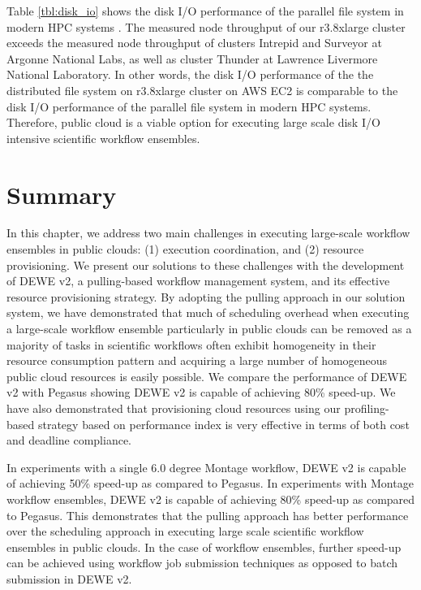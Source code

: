 Table \ref{tbl:disk_io} shows the disk I/O performance of the parallel file system in modern HPC systems \cite{borrill2009hpc}. The measured node throughput of our r3.8xlarge cluster exceeds the measured node throughput of clusters Intrepid and Surveyor at Argonne National Labs, as well as cluster Thunder at Lawrence Livermore National Laboratory. In other words, the disk I/O performance of the the distributed file system on r3.8xlarge cluster on AWS EC2 is comparable to the disk I/O performance of the parallel file system in modern HPC systems. Therefore, public cloud is a viable option for executing large scale disk I/O intensive scientific workflow ensembles.


\section{Summary}
\label{v2_sec:summary}

In this chapter, we address two main challenges in executing large-scale workflow ensembles in public clouds: (1) execution coordination, and (2) resource provisioning. We present our solutions to these challenges with the development of DEWE v2, a pulling-based workflow management system, and its effective resource provisioning strategy. 
By adopting the pulling approach in our solution system, we have demonstrated that much of scheduling overhead when executing a large-scale workflow ensemble particularly in public clouds can be removed as a majority of tasks in scientific workflows often exhibit homogeneity in their resource consumption pattern and acquiring a large number of homogeneous public cloud resources is easily possible. We compare the performance of DEWE v2 with Pegasus showing DEWE v2 is capable of achieving 80\% speed-up. We have also demonstrated that provisioning cloud resources using our profiling-based strategy based on performance index is very effective in terms of both cost and deadline compliance.

In experiments with a single 6.0 degree Montage workflow, DEWE v2 is capable of achieving 50\% speed-up as compared to Pegasus. In experiments with Montage workflow ensembles, DEWE v2 is capable of achieving 80\% speed-up as compared to Pegasus. This demonstrates that the pulling approach has better performance over the scheduling approach in executing large scale scientific workflow ensembles in public clouds. In the case of workflow ensembles, further speed-up can be achieved using workflow job submission techniques as opposed to batch submission in DEWE v2.

